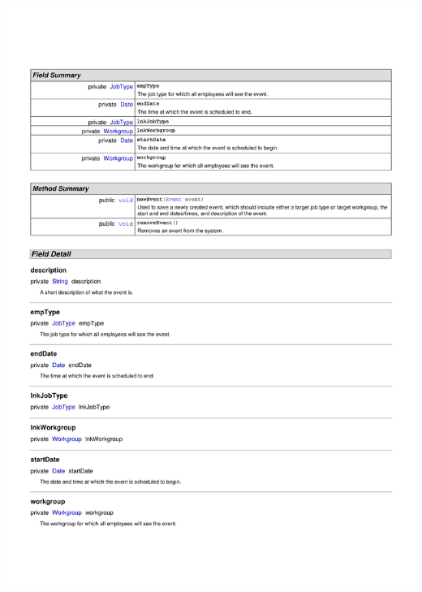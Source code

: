 \documentclass[letterpaper,12pt]{report}
\begin{document}
\includegraphics[scale=0.9,trim=20mm 30mm 25mm 25mm]{externals/ProblemDomainDataDictionary4.pdf}
\newpage
\end{document}
